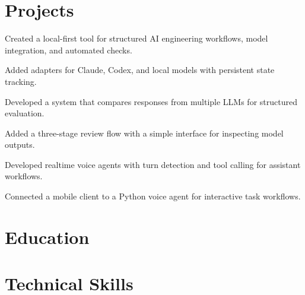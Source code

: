 \documentclass{../../templates/v3/resume-openfont}
\begin{document}
\section{Projects}
\begin{resumeitemize}
\item Created a local-first tool for structured AI engineering workflows, model integration, and automated checks.
\item Added adapters for Claude, Codex, and local models with persistent state tracking.
\end{resumeitemize}

\begin{resumeitemize}
\item Developed a system that compares responses from multiple LLMs for structured evaluation.
\item Added a three-stage review flow with a simple interface for inspecting model outputs.
\end{resumeitemize}

\begin{resumeitemize}
\item Developed realtime voice agents with turn detection and tool calling for assistant workflows.
\item Connected a mobile client to a Python voice agent for interactive task workflows.
\end{resumeitemize}

\section{Education}

\section{Technical Skills}
\end{document}
